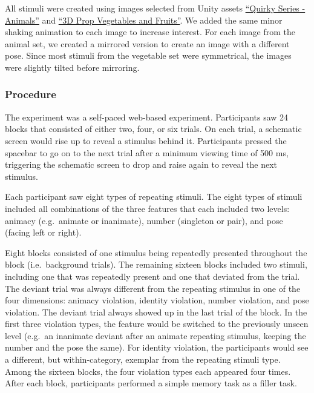 \documentclass[10pt, letterpaper]{article}
\begin{document}
All stimuli were created using images selected from Unity assets
\href{https://assetstore.unity.com/packages/3d/characters/animals/quirky-series-animals-mega-pack-vol-2-183280}{``Quirky
Series - Animals''} and
\href{https://assetstore.unity.com/packages/3d/props/food/3d-prop-vegetables-and-fruits-237790}{``3D
Prop Vegetables and Fruits''}. We added the same minor shaking animation
to each image to increase interest. For each image from the animal set,
we created a mirrored version to create an image with a different pose.
Since most stimuli from the vegetable set were symmetrical, the images
were slightly tilted before mirroring.

\hypertarget{procedure}{%
\subsubsection{Procedure}\label{procedure}}

The experiment was a self-paced web-based experiment. Participants saw
24 blocks that consisted of either two, four, or six trials. On each
trial, a schematic screen would rise up to reveal a stimulus behind it.
Participants pressed the spacebar to go on to the next trial after a
minimum viewing time of 500 ms, triggering the schematic screen to drop
and raise again to reveal the next stimulus.

Each participant saw eight types of repeating stimuli. The eight types
of stimuli included all combinations of the three features that each
included two levels: animacy (e.g.~animate or inanimate), number
(singleton or pair), and pose (facing left or right).

Eight blocks consisted of one stimulus being repeatedly presented
throughout the block (i.e.~background trials). The remaining sixteen
blocks included two stimuli, including one that was repeatedly present
and one that deviated from the trial. The deviant trial was always
different from the repeating stimulus in one of the four dimensions:
animacy violation, identity violation, number violation, and pose
violation. The deviant trial always showed up in the last trial of the
block. In the first three violation types, the feature would be switched
to the previously unseen level (e.g.~an inanimate deviant after an
animate repeating stimulus, keeping the number and the pose the same).
For identity violation, the participants would see a different, but
within-category, exemplar from the repeating stimuli type. Among the
sixteen blocks, the four violation types each appeared four times. After
each block, participants performed a simple memory task as a filler
task.
\end{document}
